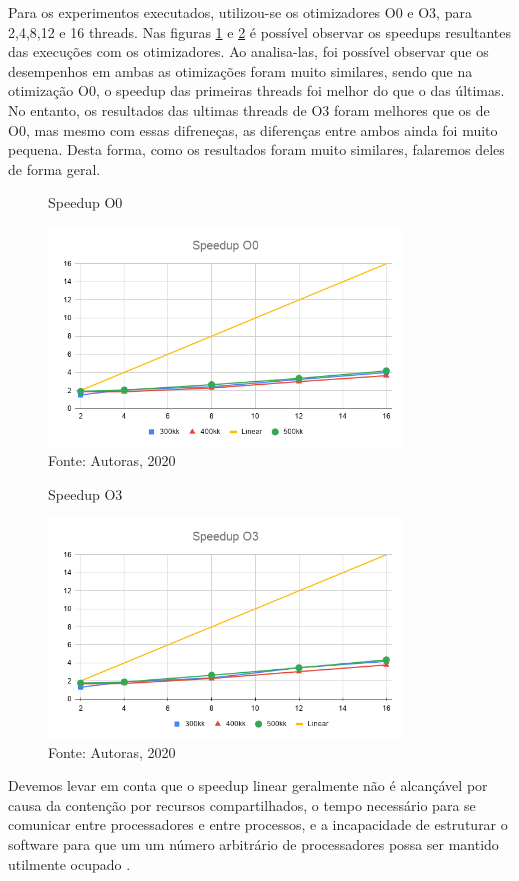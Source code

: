 \documentclass[journal]{IEEEtran}
\begin{document}
Para os experimentos executados, utilizou-se os otimizadores O0 e O3, para 2,4,8,12 e 16 threads. Nas figuras \ref{fig:speedupO0} e \ref{fig:speedupO3} é possível observar os speedups resultantes das execuções com os otimizadores. Ao analisa-las, foi possível observar que os desempenhos em ambas as otimizações foram muito similares, sendo que na otimização O0, o speedup das primeiras threads foi melhor do que o das últimas. No entanto, os resultados das ultimas threads de O3 foram melhores que os de O0, mas mesmo com essas difreneças, as diferenças entre ambos ainda foi muito pequena. Desta forma, como os resultados foram muito similares, falaremos deles de forma geral.

\begin{figure}[H]
    \centering
    \caption{Speedup O0}
    \includegraphics[width=3.7in]{imagens/SpeedupO0.png}
    \caption*{Fonte: Autoras, 2020}
    \label{fig:speedupO0}
\end{figure}

\begin{figure}[H]
    \centering
    \caption{Speedup O3}
    \includegraphics[width=3.7in]{imagens/SpeedupO3.png}
    \caption*{Fonte: Autoras, 2020}
    \label{fig:speedupO3}
\end{figure}

 
Devemos levar em conta que o speedup linear geralmente não é alcançável por causa da contenção por recursos compartilhados, o tempo necessário para se comunicar entre processadores e entre processos, e a incapacidade de estruturar o software para que um um número arbitrário de processadores possa ser mantido utilmente ocupado \cite{Eager}.
\end{document}
